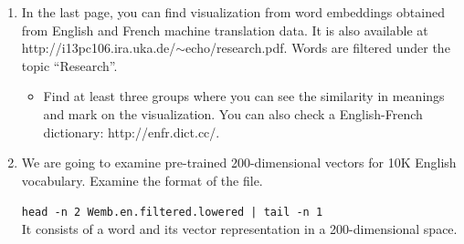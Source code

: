 \documentclass[12pt,fleqn]{article}
\begin{document}
\begin{enumerate}



\item In the last page, you can find visualization from word embeddings obtained from English and French machine translation data. It is also available at http://i13pc106.ira.uka.de/$\sim$echo/research.pdf. 
Words are filtered under the topic ``Research''. \\ 

\begin{itemize} 
 \item Find at least three groups where you can see the similarity in meanings and mark on the visualization. You can also check a English-French dictionary: http://enfr.dict.cc/. 
\end{itemize}

% 
% 



\item We are going to examine pre-trained 200-dimensional vectors for 10K English vocabulary. Examine the format of the file.  

\texttt{head -n 2 Wemb.en.filtered.lowered | tail -n 1 } \\ 
It consists of a word and its vector representation in a 200-dimensional space. \\ 


\end{enumerate}
\end{document}
